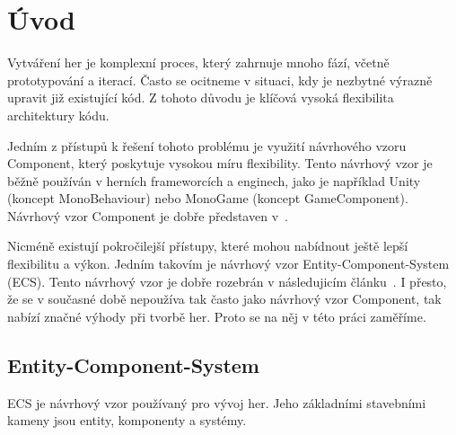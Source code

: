 \chapter{Úvod}

Vytváření her je komplexní proces, který zahrnuje mnoho fází, včetně prototypování a iterací. Často se ocitneme v situaci, kdy je nezbytné výrazně upravit již existující kód. Z tohoto důvodu je klíčová vysoká flexibilita architektury kódu.

Jedním z přístupů k řešení tohoto problému je využití návrhového vzoru Component, který poskytuje vysokou míru flexibility. Tento návrhový vzor je běžně používán v herních frameworcích a enginech, jako je například Unity (koncept MonoBehaviour) nebo MonoGame (koncept GameComponent). Návrhový vzor Component je dobře představen v~\citet{nystrom2014game}.

Nicméně existují pokročilejší přístupy, které mohou nabídnout ještě lepší flexibilitu a výkon. Jedním takovím je návrhový vzor Entity-Component-System (ECS). Tento návrhový vzor je dobře rozebrán v následujicím článku~\cite{Caini_2019}. I přesto, že se v současné době nepoužíva tak často jako návrhový vzor Component, tak nabízí značné výhody při tvorbě her. Proto se na něj v této práci zaměříme.

\section{Entity-Component-System}
ECS je návrhový vzor používaný pro vývoj her. Jeho základními stavebními kameny jsou entity, komponenty a systémy.

